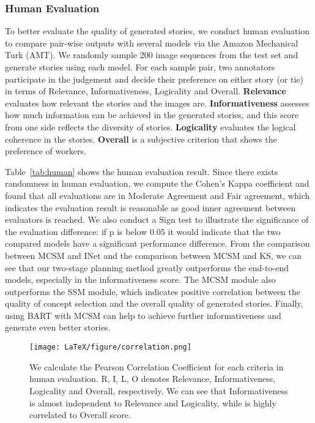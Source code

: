 \subsubsection{Human Evaluation}
To better evaluate the quality of generated stories, we conduct human evaluation to compare pair-wise outputs with several models via the Amazon Mechanical Turk (AMT). 
We randomly sample 200 image sequences from the test set and generate stories using each model. For each sample pair, two annotators participate in the judgement and decide their preference on either story (or tie) in terms of Relevance, Informativeness, Logicality and Overall. \textbf{Relevance} evaluates how relevant the stories and the images are. \textbf{Informativeness} assesses how much information can be achieved in the generated stories, and this score from one side reflects the diversity of stories. \textbf{Logicality} evaluates the logical coherence in the stories. \textbf{Overall} is a subjective criterion that shows the preference of workers. 








Table~\ref{tab:human} shows the human evaluation result. Since there exists randomness in human evaluation, we compute the Cohen's Kappa coefficient and found that all evaluations are in Moderate Agreement and Fair agreement, which indicates the evaluation result is reasonable as good inner agreement between evaluators is reached. We also conduct a Sign test to illustrate the significance of the evaluation difference: if p is below 0.05 it would indicate that the two compared models have a significant performance difference.
From the comparison between MCSM and INet and the comparison between MCSM and KS, we can see that our two-stage planning method greatly outperforms the end-to-end models, especially in the informativeness score. The MCSM module also outperforms the SSM module, which indicates positive correlation between the quality of concept selection and the overall quality of generated stories.
Finally, using BART with MCSM can help to achieve further informativeness and generate even better stories.


\begin{figure}[t]
\centering
\texttt{[image: LaTeX/figure/correlation.png]}
\caption{We calculate the Pearson Correlation Coefficient for each criteria in human evaluation. R, I, L, O denotes Relevance, Informativeness, Logicality and Overall, respectively. We can see that Informativeness is almost independent to Relevance and Logicality, while is highly correlated to Overall score.}
\label{fig:correlation}
\end{figure}



